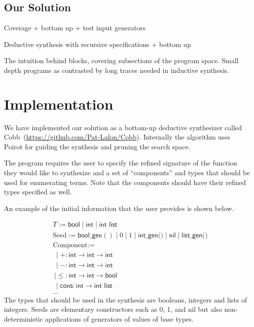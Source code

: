 \documentclass[review, sigplan]{acmart}
\begin{document}
\subsection{Our Solution}

Coverage + bottom up + test input generators

Deductive synthesis with recursive specifications + bottom up

The intuition behind blocks, covering subsections of the program space. Small
depth programs as contrasted by long traces needed in inductive synthesis.

\section{Implementation}
We have implemented our solution as a bottom-up deductive synthesizer called
Cobb~(\url{https://github.com/Pat-Lafon/Cobb}).
Internally the algorithm uses Poirot for guiding the synthesis and pruning
the search space.

The program requires the user to specify the refined signature of the function
they would like to synthesize and a set of ``components'' and types
that should be used for enumerating terms.
Note that the components should have their refined types specified as
well.

An example of the initial information that the user provides
is shown below.

\begin{align*}
   & T := \textsf{bool} \mid \textsf{int} \mid \textsf{int list}                                                            \\
   & \text{Seed} := \textsf{bool\_gen}() \mid 0 \mid 1 \mid \textsf{int\_gen()} \mid \textsf{nil} \mid \textsf{list\_gen()} \\
   & \text{Component} :=                                                                                                    \\
   & \  \mid +: \textsf{int} \rightarrow \textsf{int} \rightarrow \textsf{int}                                              \\
   & \  \mid -: \textsf{int} \rightarrow \textsf{int} \rightarrow \textsf{int}                                              \\
   & \  \mid \leq: \textsf{int} \rightarrow \textsf{int} \rightarrow \textsf{bool}                                          \\
   & \  \mid \textsf{cons}: \textsf{int} \rightarrow \textsf{int list}                                                      \\
   & \dots
\end{align*}
The types that should be used in the synthesis are
booleans, integers and lists of integers.
Seeds are elementary constructors such as 0, 1, and \textsf{nil}
but also non-deterministic applications of generators of values of
base types.
\end{document}
